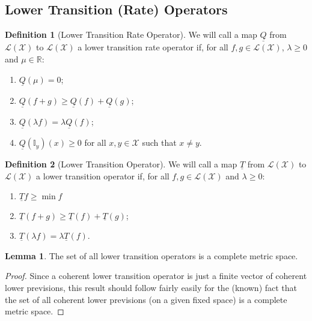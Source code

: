 \documentclass[10pt]{paper}
\theoremstyle{definition}
\newtheorem{lemma}[theorem]{Lemma}
\newtheorem{definition}{Definition}
\newcommand{\reals}{\mathbb{R}}
\newcommand{\states}{\mathcal{X}}
\newcommand{\lt}{\underline{T}}
\newcommand{\gambles}{\mathcal{L}}
\newcommand{\gamblesX}{\gambles(\states)}
\newcommand{\ind}[1]{\mathbb{I}_{#1}}
\newcommand{\lrate}{\underline{Q}}
\begin{document}
\subsection{Lower Transition (Rate) Operators}

\begin{definition}[Lower Transition Rate Operator]\label{def:coh_low_trans_rate}
We will call a map $\lrate$ from $\gamblesX$ to $\gamblesX$ a lower transition rate operator if, for all $f,g\in\gamblesX$, $\lambda\geq0$ and $\mu\in\reals$:

\vspace{5pt}
\begin{enumerate}[label=LR\arabic*:,ref=LR\arabic*]
\item\label{LR:constantzero}
$\lrate(\mu)=0$;
\item\label{LR:subadditive}
$\lrate(f+g)\geq\lrate(f)+\lrate(g)$;
\item\label{LR:homo}
$\lrate(\lambda f)=\lambda\lrate(f)$;
\item\label{LR:nondiagpos}
$\lrate(\ind{y})(x)\geq0$ for all $x,y\in\states$ such that $x\neq y$.
\end{enumerate}
\vspace{5pt}
\end{definition}


\begin{definition}[Lower Transition Operator]\label{def:coh_low_trans}
We will call a map $\lt$ from $\gamblesX$ to $\gamblesX$ a lower transition operator if, for all $f,g\in\gamblesX$ and $\lambda\geq0$:

\vspace{5pt}
\begin{enumerate}[label=C\arabic*:]
\item
$\lt f\geq\min f$
\item
$\lt(f+g)\geq\lt(f)+\lt(g)$;
\item
$\lt(\lambda f)=\lambda\lt(f)$.
\end{enumerate}
\vspace{5pt}
\end{definition}

\begin{lemma}\label{lemma:completemetricspace}
The set of all lower transition operators is a complete metric space.
\end{lemma}
\begin{proof}
Since a coherent lower transition operator is just a finite vector of coherent lower previsions, this result should follow fairly easily for the (known) fact that the set of all coherent lower previsions (on a given fixed space) is a complete metric space.
\end{proof}
\end{document}
